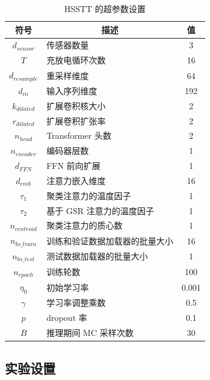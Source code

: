 \documentclass[UTF8,journal,twoside,web]{ieeecolor}
\begin{document}
\begin{table}[htbp]
  \centering
  \caption{HSSTT 的超参数设置}
  \scalebox{0.8}
    {
      \small
    \begin{tabular}{clc}
    \toprule
    符号 & \multicolumn{1}{c}{描述} & 值 \\
    \midrule
    $d_{sensor}$ & 传感器数量 & 3 \\
    $T$ & 充放电循环次数 & 16 \\
    $d_{resample}$ & 重采样维度 & 64 \\
    $d_{in}$ & 输入序列维度 & 192 \\
    $k_{dilated}$ & 扩展卷积核大小 & 2 \\
    $r_{dilated}$ & 扩展卷积扩张率 & 2 \\
    $n_{head}$ & Transformer 头数 & 2 \\
    $n_{encoder}$ & 编码器层数 & 1 \\
    $d_{FFN}$ & FFN 前向扩展 & 1 \\
    $d_{emb}$ & 注意力嵌入维度 & 16 \\
    $\tau_{1}$ & 聚类注意力的温度因子 & 1 \\
    $\tau_{2}$ & 基于 GSR 注意力的温度因子 & 1 \\
    $n_{centroid}$ & 聚类注意力的质心数 & 1 \\
    $n_{bs\_train}$ & 训练和验证数据加载器的批量大小 & 16 \\
    $n_{bs\_test}$ & 测试数据加载器的批量大小 & 1 \\
    $n_{epoch}$ & 训练轮数 & 100 \\
    $\eta_{0}$ & 初始学习率 & 0.001 \\
    $\gamma$ & 学习率调整乘数 & 0.5 \\
    $p$     & dropout 率 & 0.1 \\
    $B$     & 推理期间 MC 采样次数 & 30 \\
    \bottomrule
    \end{tabular}%
  \label{tab:hyperparams}%
    }
\end{table}%

\subsection{实验设置}\label{subsec:experimental_setup}
\end{document}

